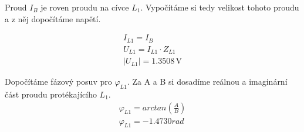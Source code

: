Proud \( I_B \) je roven proudu na cívce \( L_1 \).
Vypočítáme si tedy velikost tohoto proudu a z něj dopočítáme napětí.
\nopagebreak

\[
\begin{array}{l}
I_{L1} = I_B \\
U_{L1} = I_{L1} \cdot Z_{L1} \\
|U_{L1}| = 1.3508 \, \mathrm{V}
\end{array}
\]
\par

Dopočítáme fázový posuv pro \( \varphi_{L1} \).
Za A a B si dosadíme reálnou a imaginární část proudu protékajícího \( L_1 \).
\[
\begin{array}{l}
\varphi_{L1} = arctan(\frac{A}{B}) \\
\varphi_{L1} = -1.4730 rad
\end{array}
\]